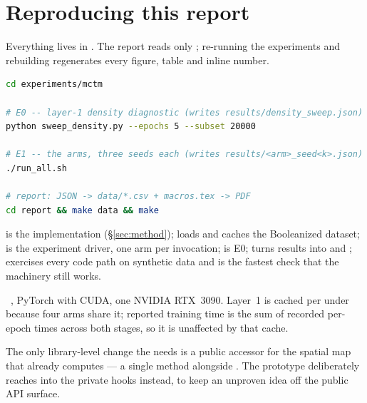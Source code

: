 \section{Reproducing this report}
\label{sec:repro}

Everything lives in . The report reads only
; re-running the experiments and rebuilding regenerates every figure,
table and inline number.

\begin{lstlisting}[language=bash]
cd experiments/mctm

# E0 -- layer-1 density diagnostic (writes results/density_sweep.json)
python sweep_density.py --epochs 5 --subset 20000

# E1 -- the arms, three seeds each (writes results/<arm>_seed<k>.json)
./run_all.sh

# report: JSON -> data/*.csv + macros.tex -> PDF
cd report && make data && make
\end{lstlisting}

  is the implementation (\S\ref{sec:method}); 
loads and caches the Booleanized dataset;  is the experiment driver, one arm per
invocation;  is E0;  turns results into
 and ;  exercises every code
path on synthetic data and is the fastest check that the machinery still works.

 \ttlibname\ \ttversionreport, PyTorch with CUDA, one NVIDIA RTX~3090.
Layer~1 is cached per  under  because four arms share it;
reported training time is the sum of recorded per-epoch times across both stages, so it is
unaffected by that cache.

 The only library-level change the \mctm needs is a public accessor for
the spatial map that  already computes --- a single method
alongside . The prototype deliberately reaches into the private
hooks instead, to keep an unproven idea off the public API surface.
